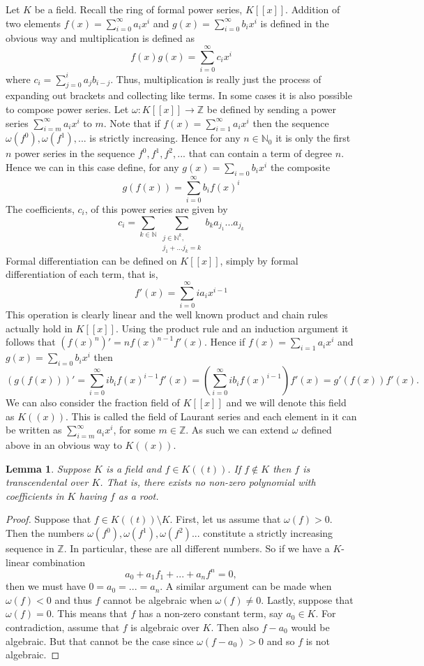 \documentclass{article}
\newtheorem{lemma}{Lemma}[section]
\newcommand{\mbb}[1]{\mathbb{#1}}
\begin{document}
Let $K$ be a field. Recall the ring of formal power series, $K[[x]]$. Addition of two elements $f(x) = \sum_{i = 0}^\infty a_ix^i$ and $g(x) = \sum_{i = 0}^\infty b_ix^i$ is defined in the obvious way and multiplication is defined as
$$f(x)g(x) = \sum_{i = 0}^{\infty}c_i x^i$$
where $c_i = \sum_{j = 0}^i a_j b_{i-j}$. Thus, multiplication is really just the process of expanding out brackets and collecting like terms. In some cases it is also possible to compose power series. Let $\omega : K[[x]] \to \mbb Z$ be defined by sending a power series $\sum_{i = m}^\infty a_i x^i$ to $m$. Note that if $f(x) = \sum_{i = 1}^\infty a_ix^i$ then the sequence $\omega(f^0), \omega(f^1), ...$ is strictly increasing. Hence for any $n \in \mbb N_0$ it is only the first $n$ power series in the sequence $f^0, f^1, f^2, ...$ that can contain a term of degree $n$. Hence we can in this case define, for any $g(x) = \sum_{i = 0} b_i x^i$ the composite
$$g(f(x)) = \sum_{i = 0}^\infty b_i f(x)^i$$
The coefficients, $c_i$, of this power series are given by 
$$c_i = \sum_{k \in \mbb N} \sum_{\substack{j \in \mbb N^k, \\ j_1 + ... j_k = k}} b_k a_{j_1}...a_{j_k} $$
Formal differentiation can be defined on $K[[x]]$, simply by formal differentiation of each term, that is, 
$$f'(x) = \sum_{i = 0}^\infty i a_{i} x^{i-1}$$
This operation is clearly linear and the well known product and chain rules actually hold in $K[[x]]$. Using the product rule and an induction argument it follows that $(f(x)^n)' = n f(x)^{n-1}f'(x)$. Hence if $f(x) = \sum_{i = 1} a_i x^i$ and $g(x) = \sum_{i = 0} b_i x^i$ then
$$(g(f(x)))' = \sum_{i = 0}^\infty ib_i f(x)^{i-1}f'(x) = (\sum_{i = 0}^\infty i b_i f(x)^{i-1})f'(x) = g'(f(x))f'(x).$$ 
We can also consider the fraction field of $K[[x]]$ and we will denote this field as $K((x))$. This is called the field of Laurant series and each element in it can be written as $\sum_{i = m}^\infty a_i x^i$, for some $m \in \mbb Z$. As such we can extend $\omega$ defined above in an obvious way to $K((x))$. 

\begin{lemma}\label{lem: Unit power series is transcendental}
    Suppose $K$ is a field and $f \in K((t))$. If $f \notin K$ then $f$ is transcendental over $K$. That is, there exists no non-zero polynomial with coefficients in $K$ having $f$ as a root. 
\end{lemma}
\begin{proof}
    Suppose that $f \in K((t)) \setminus K$. First, let us assume that $\omega(f) > 0$. Then the numbers $\omega(f^0), \omega(f^1),\omega(f^2) ...$ constitute a strictly increasing sequence in $\mbb Z$. In particular, these are all different numbers. So if we have a $K$-linear combination
    $$a_0 + a_1 f_1 + ... + a_nf^n = 0,$$
    then we must have $0 = a_0 = ... = a_n$. A similar argument can be made when $\omega(f) < 0$ and thus $f$ cannot be algebraic when $\omega(f) \neq 0$. Lastly, suppose that $\omega(f) = 0$. This means that $f$ has a non-zero constant term, say $a_0 \in K$. For contradiction, assume that $f$ is algebraic over $K$. Then also $f - a_0$ would be algebraic. But that cannot be the case since $\omega(f - a_0) > 0$ and so $f$ is not algebraic.  
\end{proof}
\end{document}
